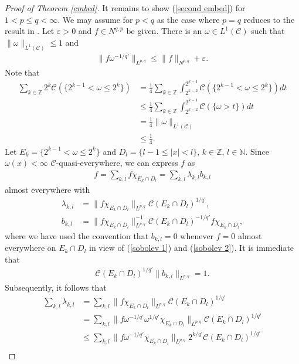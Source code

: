 \documentclass[10pt,reqno]{amsart}
\numberwithin{equation}{section}
\begin{document}
\begin{proof}[Proof of Theorem \ref{embed}]
It remains to show (\ref{second embed}) for $1<p\leq q<\infty$. We may assume for $p<q$ as the case where $p=q$ reduces to the result in \cite{OP}. Let $\varepsilon>0$ and $f\in N^{q,p}$ be given. There is an $\omega\in L^{1}(\mathcal{C})$ such that $\|\omega\|_{L^{1}(\mathcal{C})}\leq 1$ and 
\begin{align*}
\|f\omega^{-1/q'}\|_{L^{p,q}}\leq\|f\|_{N^{p,q}}+\varepsilon.
\end{align*}
Note that 
\begin{align*}
\sum_{k\in\mathbb{Z}}2^{k}\mathcal{C}(\{2^{k-1}<\omega\leq 2^{k}\})&=\frac{1}{4}\sum_{k\in\mathbb{Z}}\int_{2^{k-2}}^{2^{k-1}}\mathcal{C}(\{2^{k-1}<\omega\leq 2^{k}\})dt\\
&\leq\frac{1}{4}\sum_{k\in\mathbb{Z}}\int_{2^{k-2}}^{2^{k-1}}\mathcal{C}(\{\omega>t\})dt\\
&=\frac{1}{4}\|\omega\|_{L^{1}(\mathcal{C})}\\
&\leq\frac{1}{4}.
\end{align*}
Let $E_{k}=\{2^{k-1}<\omega\leq 2^{k}\}$ and $D_{l}=\{l-1\leq|x|<l\}$, $k\in\mathbb{Z}$, $l\in\mathbb{N}$. Since $\omega(x)<\infty$ $\mathcal{C}$-quasi-everywhere, we can express $f$ as
\begin{align*}
f=\sum_{k,l}f\chi_{E_{k}\cap D_{l}}=\sum_{k,l}\lambda_{k,l}b_{k,l}
\end{align*}
almost everywhere with 
\begin{align*}
\lambda_{k,l}&=\|f\chi_{E_{k}\cap D_{l}}\|_{L^{p,q}}\mathcal{C}(E_{k}\cap D_{l})^{1/q'},\\
b_{k,l}&=\|f\chi_{E_{k}\cap D_{l}}\|_{L^{p,q}}^{-1}\mathcal{C}(E_{k}\cap D_{l})^{-1/q'}f\chi_{E_{k}\cap D_{l}},
\end{align*}
where we have used the convention that $b_{k,l}=0$ whenever $f=0$ almost everywhere on $E_{k}\cap D_{l}$ in view of (\ref{sobolev 1}) and (\ref{sobolev 2}). It is immediate that 
\begin{align*}
\mathcal{C}(E_{k}\cap D_{l})^{1/q'}\|b_{k,l}\|_{L^{p,q}}=1.
\end{align*}
Subsequently, it follows that 
\begin{align*}
\sum_{k,l}\lambda_{k,l}&=\sum_{k,l}\|f\chi_{E_{k}\cap D_{l}}\|_{L^{p,q}}\mathcal{C}(E_{k}\cap D_{l})^{1/q'}\\
&=\sum_{k,l}\|f\omega^{-1/q'}\omega^{1/q'}\chi_{E_{k}\cap D_{l}}\|_{L^{p,q}}\mathcal{C}(E_{k}\cap D_{l})^{1/q'}\\
&\leq\sum_{k,l}\|f\omega^{-1/q'}\chi_{E_{k}\cap D_{l}}\|_{L^{p,q}}2^{k/q'}\mathcal{C}(E_{k}\cap D_{l})^{1/q'}\\

\end{align*}
\end{proof}
\end{document}
